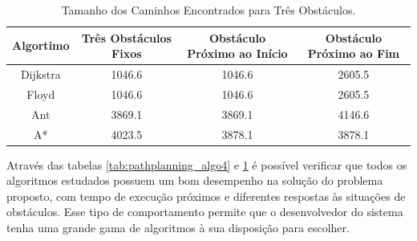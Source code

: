 \begin{table}[h!]
        \centering
        \caption{Tamanho dos Caminhos Encontrados para Três Obstáculos. \cite{he2017comparison}}
        \begin{tabular}{| c | c | c | c |}
        \hline
        \textbf{Algortimo} & \textbf{Três Obstáculos Fixos} & \textbf{Obstáculo Próximo ao Início} & \textbf{Obstáculo Próximo ao Fim} \\
        \hline
            Dijkstra & 1046.6 & 1046.6 & 2605.5 \\
            \hline
            Floyd & 1046.6 & 1046.6 & 2605.5  \\
            \hline
            Ant & 3869.1 & 3869.1 & 4146.6 \\
            \hline
            A* & 4023.5 &  3878.1 & 3878.1 \\
        \hline
        \end{tabular}
        \label{tab:pathplanning_algo42}
    \end{table}
    \par
    Através das tabelas \ref{tab:pathplanning_algo4} e \ref{tab:pathplanning_algo42} é possível verificar que todos os algoritmos estudados possuem um bom desempenho na solução do problema proposto, com tempo de execução próximos e diferentes respostas às situações de obstáculos. Esse tipo de comportamento permite que o desenvolvedor do sistema tenha uma grande gama de algoritmos à sua disposição para escolher. \cite{he2017comparison} 

